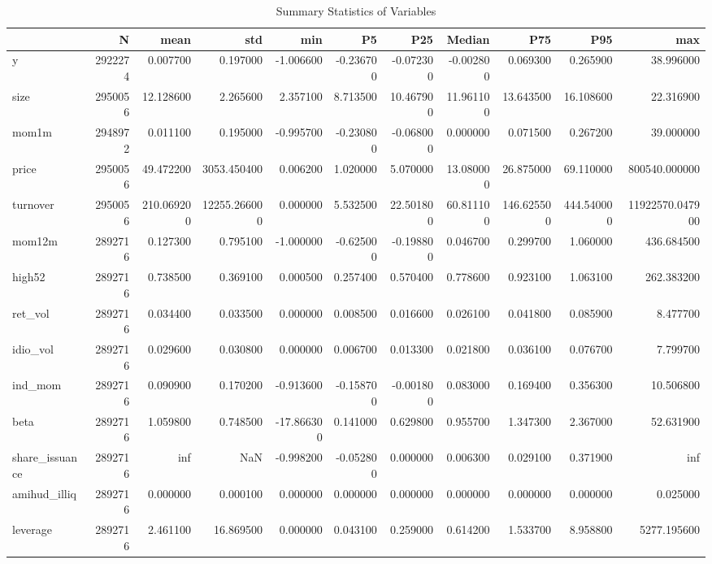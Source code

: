 \begin{table}
\caption{Summary Statistics of Variables}
\label{tab:summary_stats}
\begin{tabular}{lrrrrrrrrrr}
\toprule
 & N & mean & std & min & P5 & P25 & Median & P75 & P95 & max \\
\midrule
y & 2922274 & 0.007700 & 0.197000 & -1.006600 & -0.236700 & -0.072300 & -0.002800 & 0.069300 & 0.265900 & 38.996000 \\
size & 2950056 & 12.128600 & 2.265600 & 2.357100 & 8.713500 & 10.467900 & 11.961100 & 13.643500 & 16.108600 & 22.316900 \\
mom1m & 2948972 & 0.011100 & 0.195000 & -0.995700 & -0.230800 & -0.068000 & 0.000000 & 0.071500 & 0.267200 & 39.000000 \\
price & 2950056 & 49.472200 & 3053.450400 & 0.006200 & 1.020000 & 5.070000 & 13.080000 & 26.875000 & 69.110000 & 800540.000000 \\
turnover & 2950056 & 210.069200 & 12255.266000 & 0.000000 & 5.532500 & 22.501800 & 60.811100 & 146.625500 & 444.540000 & 11922570.047900 \\
mom12m & 2892716 & 0.127300 & 0.795100 & -1.000000 & -0.625000 & -0.198800 & 0.046700 & 0.299700 & 1.060000 & 436.684500 \\
high52 & 2892716 & 0.738500 & 0.369100 & 0.000500 & 0.257400 & 0.570400 & 0.778600 & 0.923100 & 1.063100 & 262.383200 \\
ret_vol & 2892716 & 0.034400 & 0.033500 & 0.000000 & 0.008500 & 0.016600 & 0.026100 & 0.041800 & 0.085900 & 8.477700 \\
idio_vol & 2892716 & 0.029600 & 0.030800 & 0.000000 & 0.006700 & 0.013300 & 0.021800 & 0.036100 & 0.076700 & 7.799700 \\
ind_mom & 2892716 & 0.090900 & 0.170200 & -0.913600 & -0.158700 & -0.001800 & 0.083000 & 0.169400 & 0.356300 & 10.506800 \\
beta & 2892716 & 1.059800 & 0.748500 & -17.866300 & 0.141000 & 0.629800 & 0.955700 & 1.347300 & 2.367000 & 52.631900 \\
share_issuance & 2892716 & inf & NaN & -0.998200 & -0.052800 & 0.000000 & 0.006300 & 0.029100 & 0.371900 & inf \\
amihud_illiq & 2892716 & 0.000000 & 0.000100 & 0.000000 & 0.000000 & 0.000000 & 0.000000 & 0.000000 & 0.000000 & 0.025000 \\
leverage & 2892716 & 2.461100 & 16.869500 & 0.000000 & 0.043100 & 0.259000 & 0.614200 & 1.533700 & 8.958800 & 5277.195600 \\

\end{tabular}
\end{table}
